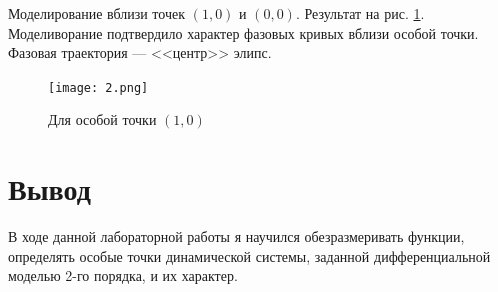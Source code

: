 \documentclass[14pt]{extarticle}
\begin{document}
Моделирование вблизи точек $(1,0)$ и $(0,0)$. Результат на рис. \ref{second}. Моделиворание подтвердило характер фазовых кривых вблизи особой точки. Фазовая траектория --- <<центр>> элипс.
\begin{figure}[!h]
  \centering
  \texttt{[image: 2.png]}
  \caption{Для особой точки $(1,0)$\label{second}}
\end{figure}

\newpage
\section{Вывод}
В ходе данной лабораторной работы я научился обезразмеривать функции, определять особые точки динамической системы, заданной дифференциальной моделью 2-го порядка, и их характер.
\end{document}
